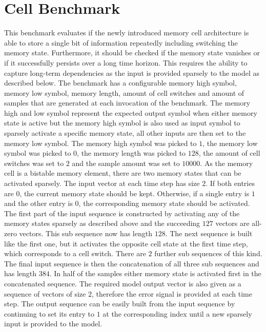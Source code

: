 \documentclass[draft,final]{vutinfth} %
\begin{document}
    \section{Cell Benchmark} \label{cell}
    This benchmark evaluates if the newly introduced memory cell architecture is able to store a single bit of information repeatedly including switching the memory state.
    Furthermore, it should be checked if the memory state vanishes or if it successfully persists over a long time horizon.
    This requires the ability to capture long-term dependencies as the input is provided sparsely to the model as described below.
    The benchmark has a configurable memory high symbol, memory low symbol, memory length, amount of cell switches and amount of samples that are generated at each invocation of the benchmark.
    The memory high and low symbol represent the expected output symbol when either memory state is active but the memory high symbol is also used as input symbol to sparsely activate a specific memory state, all other inputs are then set to the memory low symbol.
    The memory high symbol was picked to $1$, the memory low symbol was picked to $0$, the memory length was picked to $128$, the amount of cell switches was set to $2$ and the sample amount was set to $10000$.
    As the memory cell is a bistable memory element, there are two memory states that can be activated sparsely.
    The input vector at each time step has size $2$. If both entries are $0$, the current memory state should be kept.
    Otherwise, if a single entry is $1$ and the other entry is $0$, the corresponding memory state should be activated.
    The first part of the input sequence is constructed by activating any of the memory states sparsely as described above and the succeeding $127$ vectors are all-zero vectors.
    This sub sequence now has length $128$. The next sequence is built like the first one, but it activates the opposite cell state at the first time step, which corresponds to a cell switch.
    There are $2$ further sub sequences of this kind. The final input sequence is then the concatenation of all three sub sequences and has length $384$.
    In half of the samples either memory state is activated first in the concatenated sequence.
    The required model output vector is also given as a sequence of vectors of size $2$, therefore the error signal is provided at each time step.
    The output sequence can be easily built from the input sequence by continuing to set its entry to $1$ at the corresponding index until a new sparsely input is provided to the model.
\end{document}
